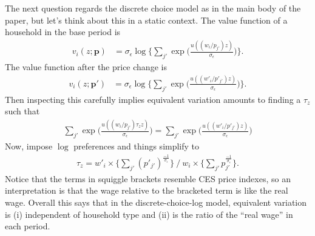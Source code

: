 \documentclass[12pt,pdftex]{article}
\begin{document}
\begin{onehalfspacing}
The next question regards the discrete choice model as in the main body of the paper, but let's think about this in a static context. The value function of a household in the base period is
\begin{align}
v_i(z ; \mathbf{p}) & = \sigma_{\epsilon} \log \bigg \{ \sum_{j'} \exp \bigg ( \frac{u( (w_i / p_{j'}) z )}{\sigma_{\epsilon}} \bigg ) \bigg \}.
\end{align}
The value function after the price change is
\begin{align}
v_i(z ; \mathbf{p'}) & = \sigma_{\epsilon} \log \bigg \{ \sum_{j'} \exp \bigg ( \frac{u( (w'_i / p'_{j'}) z )}{\sigma_{\epsilon}} \bigg ) \bigg \}.
\end{align}
Then inspecting this carefully implies equivalent variation amounts to finding a $\tau_{z}$ such that
\begin{align}
\sum_{j'} \exp \bigg ( \frac{u( (w_i / p_{j'}) \tau_{z} z )}{\sigma_{\epsilon}} \bigg ) = \sum_{j'} \exp \bigg ( \frac{u( (w'_i / p'_{j'}) z )}{\sigma_{\epsilon}} \bigg )
\end{align}
Now, impose $\log$ preferences and things simplify to
\begin{align}
\tau_{z} = w'_i \times \bigg \{ \sum_{j'}  ( p'_{j'} )^{\frac{-1}{\sigma_{\epsilon}}} \bigg \} \ \bigg /  \ w_i \times \bigg  \{ \sum_{j'}  p^{\frac{-1}{\sigma_{\epsilon}}}_{j'} \bigg \}.
\end{align}
Notice that the terms in squiggle brackets resemble CES price indexes, so an interpretation is that the wage relative to the bracketed term is like the real wage. Overall this says that in the discrete-choice-log model, equivalent variation is (i) independent of household type and (ii) is the ratio of the ``real wage'' in each period.


\end{onehalfspacing}
\end{document}
